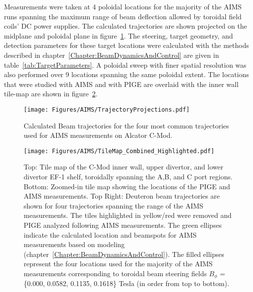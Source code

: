 \documentclass[final,3p,times,twocolumn]{elsarticle}
\begin{document}
%
%
\label{sec:AIMSPIGEGeometry}
Measurements were taken at 4 poloidal locations for the majority of the AIMS runs spanning the maximum range of beam deflection allowed by toroidal field coils' DC power supplies. The calculated trajectories are shown projected on the midplane and poloidal plane in figure~\ref{fig:TrajectoryProjections}.  The steering, target geometry, and detection  parameters for these target locations were calculated with the methods described in chapter~\ref{Chapter:BeamDynamicsAndControl} are given in table~\ref{tab:TargetParameters}.  A poloidal sweep with finer spatial resolution was also performed over 9 locations spanning the same poloidal extent.  The locations that were studied with AIMS and with PIGE are overlaid with the inner wall tile-map are shown in figure~\ref{fig:TileMap0}. %
%
\begin{figure}[h!]
 \centering
  \texttt{[image: Figures/AIMS/TrajectoryProjections.pdf]}
 \caption{Calculated Beam trajectories for the four most common trajectories used
for AIMS measurements on Alcator C-Mod.}
 \label{fig:TrajectoryProjections}
\end{figure}
%
%
\begin{figure}[p]
 \centering
  \texttt{[image: Figures/AIMS/TileMap\_Combined\_Highlighted.pdf]}
 \caption{\small Top: Tile map of the C-Mod inner wall, upper divertor, and lower divertor EF-1 shelf, toroidally spanning the A,B, and C port regions. Bottom: Zoomed-in tile map showing the locations of the PIGE and AIMS measurements.  Top Right: Deuteron beam trajectories are shown for four trajectories spanning the range of the AIMS measurements. The tiles highlighted in yellow/red were removed and PIGE analyzed following AIMS measurements.  The green ellipses indicate the calculated location and beamspots for AIMS measurements based on modeling (chapter~\ref{Chapter:BeamDynamicsAndControl}).  The filled ellipses represent the four locations used for the majority of the AIMS measurements corresponding to toroidal beam steering fields $B_\phi$ = \{0.000, 0.0582, 0.1135, 0.1618\} Tesla (in order from top to bottom).  }
 \label{fig:TileMap0}
\end{figure}
\end{document}
